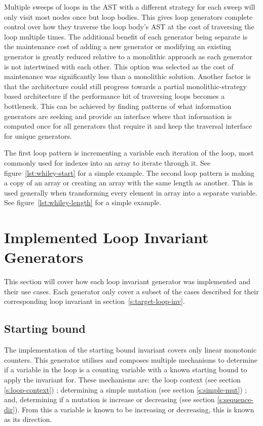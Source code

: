 Multiple sweeps of loops in the AST with a different strategy for each sweep
will only visit most nodes once but loop bodies.
This gives loop generators complete control over how they traverse the loop
body's AST at the cost of traversing the loop multiple times.
The additional benefit of each generator being separate is the maintenance cost
of adding a new generator or modifying an existing generator is greatly reduced
relative to a monolithic approach as each generator is not intertwined with
each other.
This option was selected as the cost of maintenance was significantly less
than a monolithic solution.
Another factor is that the architecture could still progress towards
a partial monolithic-strategy based architecture if the performance hit
of traversing loops becomes a bottleneck.
This can be achieved by finding patterns of what information generators are
seeking and provide an interface where that information is computed once for
all generators that require it and keep the traversal interface for unique generators.


The first loop pattern is incrementing a variable
each iteration of the loop, most commonly used for indexes into an array to
iterate through it. See figure~\ref{lst:whiley-start} for a simple example.
The second loop pattern is making a copy of an array or creating an array with
the same length as another.
This is used generally when transforming every element in array into a separate
variable. See figure~\ref{lst:whiley-length} for a simple example.

\section{Implemented Loop Invariant Generators}

This section will cover how each loop invariant generator was implemented and their use cases.
Each generator only cover a subset of the cases described 
for their corresponding loop invariant in section~\ref{s:target-loop-inv}.

\subsection{Starting bound}

The implementation of the starting bound invariant covers only linear monotonic counters.
This generator utilises and composes multiple mechanisms to determine 
if a variable in the
loop is a counting variable with a known starting bound to apply the invariant for.
These mechanisms are: the loop context (see section \ref{s:loop-context}) ;
determining a simple mutation (see section \ref{s:simple-mut}) ; and,
determining if a mutation is increase or decreasing (see section \ref{s:sequence-dir}).
From this a variable is known to be increasing or decreasing, this is known as its direction.

